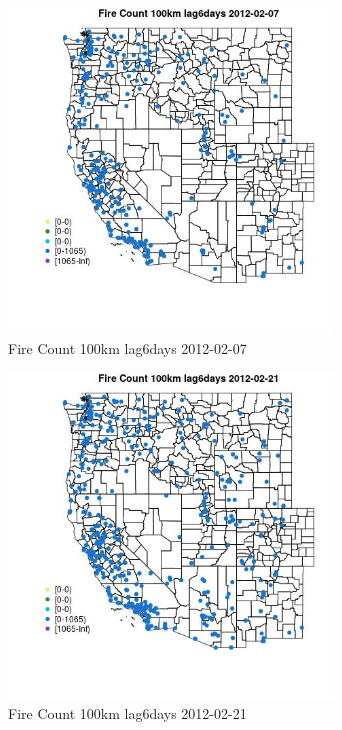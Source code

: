 \begin{figure} 
\centering  
\includegraphics[width=0.77\textwidth]{Code_Outputs/Report_ML_input_PM25_Step4_part_f_de_duplicated_aveswNAs_MapObsFire_Count_100km_lag6days2012-02-07.jpg} 
\caption{\label{fig:Report_ML_input_PM25_Step4_part_f_de_duplicated_aveswNAsMapObsFire_Count_100km_lag6days2012-02-07}Fire Count 100km lag6days 2012-02-07} 
\end{figure} 
 

\begin{figure} 
\centering  
\includegraphics[width=0.77\textwidth]{Code_Outputs/Report_ML_input_PM25_Step4_part_f_de_duplicated_aveswNAs_MapObsFire_Count_100km_lag6days2012-02-21.jpg} 
\caption{\label{fig:Report_ML_input_PM25_Step4_part_f_de_duplicated_aveswNAsMapObsFire_Count_100km_lag6days2012-02-21}Fire Count 100km lag6days 2012-02-21} 
\end{figure} 
 


